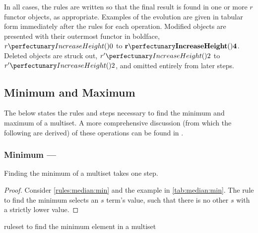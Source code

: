 In all cases, the rules are written so that the final result is found in one or more \(r\) \gls{functor} objects, as appropriate.  Examples of the evolution are given in tabular form immediately after the rules for each operation.  Modified objects are presented with their outermost \gls{functor} in boldface, \eg{} \(\cpfunc{r}{0}\) to \(\mathbf{\cpfunc{r}{4}}\).  Deleted objects are struck out, \eg{} \(\cpfunc{r'}{2}\) to \sout{\(\cpfunc{r'}{2}\)}, and omitted entirely from later steps.


\subsection{\label{sec:median:minmax}Minimum and Maximum}

The below states the rules and steps necessary to find the minimum and maximum of a multiset.  A more comprehensive discussion (from which the following are derived) of these operations can be found in \cite{Cooper2019,Nicolescu2018}.

\subsubsection{Minimum --- }\label{sec:median:min}

\begin{proposition}\label{prop:median:min}
Finding the minimum of a multiset takes one step.
\end{proposition}

\begin{proof}
Consider \cref{rules:median:min} and the example in \cref{tab:median:min}.  The rule to find the minimum selects an \(s\) term's value, such that there is no other \(s\) with a strictly lower value.
\end{proof}

\begin{cprulesetfloat}
\begin{cpruleset}
\end{cpruleset}
\caption{\label{rules:median:min}\Gls{ruleset} to find the minimum element in a multiset}
\end{cprulesetfloat}

